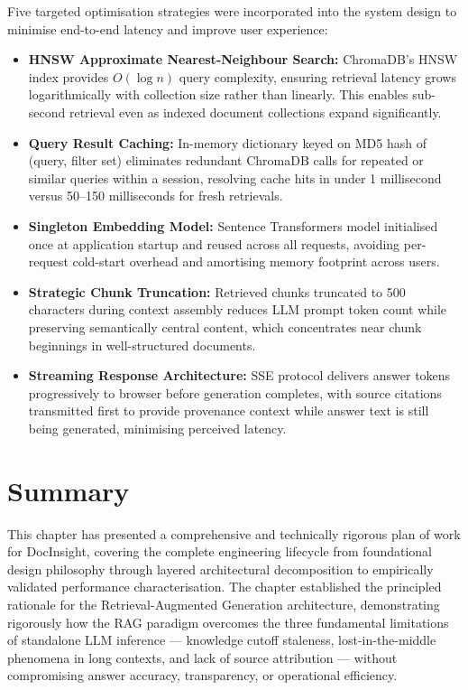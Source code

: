 Five targeted optimisation strategies were incorporated into the system design to minimise end-to-end latency and improve user experience:

\begin{itemize}
\item \textbf{HNSW Approximate Nearest-Neighbour Search:} ChromaDB's HNSW index provides $O(\log n)$ query complexity, ensuring retrieval latency grows logarithmically with collection size rather than linearly. This enables sub-second retrieval even as indexed document collections expand significantly.

\item \textbf{Query Result Caching:} In-memory dictionary keyed on MD5 hash of (query, filter set) eliminates redundant ChromaDB calls for repeated or similar queries within a session, resolving cache hits in under 1 millisecond versus 50--150 milliseconds for fresh retrievals.

\item \textbf{Singleton Embedding Model:} Sentence Transformers model initialised once at application startup and reused across all requests, avoiding per-request cold-start overhead and amortising memory footprint across users.

\item \textbf{Strategic Chunk Truncation:} Retrieved chunks truncated to 500 characters during context assembly reduces LLM prompt token count while preserving semantically central content, which concentrates near chunk beginnings in well-structured documents.

\item \textbf{Streaming Response Architecture:} SSE protocol delivers answer tokens progressively to browser before generation completes, with source citations transmitted first to provide provenance context while answer text is still being generated, minimising perceived latency.
\end{itemize}

\section{Summary}

This chapter has presented a comprehensive and technically rigorous plan of work for DocInsight, covering the complete engineering lifecycle from foundational design philosophy through layered architectural decomposition to empirically validated performance characterisation. The chapter established the principled rationale for the Retrieval-Augmented Generation architecture, demonstrating rigorously how the RAG paradigm overcomes the three fundamental limitations of standalone LLM inference --- knowledge cutoff staleness, lost-in-the-middle phenomena in long contexts, and lack of source attribution --- without compromising answer accuracy, transparency, or operational efficiency.

